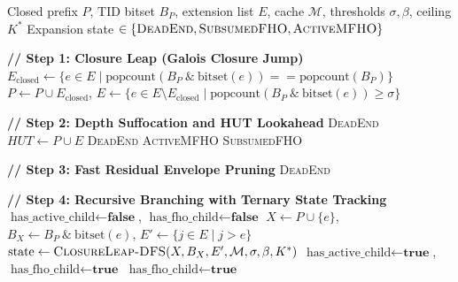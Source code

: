 \documentclass[runningheads,orivec]{llncs}
\newcommand{\supp}{\operatorname{sup}}
\newcommand{\aocc}{\operatorname{aocc}}
\begin{document}
\begin{algorithm}[htbp]
\caption{\textsc{ClosureLeap-DFS}}
\label{alg:dfs}
\begin{algorithmic}[1]
\footnotesize
\setlength{\itemsep}{0pt}
\linespread{0.90}\selectfont
\Require Closed prefix $P$, TID bitset $B_P$, extension list $E$, cache $\mathcal{M}$, thresholds $\sigma, \beta$, ceiling $K^*$
\Ensure Expansion state $\in \{\textsc{DeadEnd}, \textsc{SubsumedFHO}, \textsc{ActiveMFHO}\}$

\State \textbf{// Step 1: Closure Leap (Galois Closure Jump)} 
\State $E_{\mathrm{closed}} \gets \{e \in E \mid \text{popcount}(B_P \ \& \ \text{bitset}(e)) == \text{popcount}(B_P)\}$
\State $P \gets P \cup E_{\mathrm{closed}}$, \quad $E \gets \{e \in E \setminus E_{\mathrm{closed}} \mid \text{popcount}(B_P \ \& \ \text{bitset}(e)) \ge \sigma\}$

\State \textbf{// Step 2: Depth Suffocation and HUT Lookahead} 
 \Return \textsc{DeadEnd} \EndIf {}
\State $HUT \gets P \cup E$
 \Return \textsc{DeadEnd} \EndIf {}
\If{$\supp(HUT) \ge \sigma$ \textbf{and} $\aocc(HUT) \ge \beta$} 
        \State {}
        \State \Return \textsc{ActiveMFHO} 
    \Else
        \State \Return \textsc{SubsumedFHO} 
    \EndIf
\EndIf

\State \textbf{// Step 3: Fast Residual Envelope Pruning} 
 \Return \textsc{DeadEnd} \EndIf

\State \textbf{// Step 4: Recursive Branching with Ternary State Tracking}
\State $\text{has\_active\_child} \gets \textbf{false}$, \quad $\text{has\_fho\_child} \gets \textbf{false}$
    \State $X \gets P \cup \{e\}$, \quad $B_X \gets B_P \ \& \ \text{bitset}(e)$, \quad $E' \gets \{j \in E \mid j > e\}$
    \State $\text{state} \gets \Call{ClosureLeap-DFS}{X, B_X, E', \mathcal{M}, \sigma, \beta, K^*}$
        \State $\text{has\_active\_child} \gets \textbf{true}$, \quad $\text{has\_fho\_child} \gets \textbf{true}$
        \State $\text{has\_fho\_child} \gets \textbf{true}$
    \EndIf
\EndFor


\end{algorithmic}
\end{algorithm}
\end{document}
